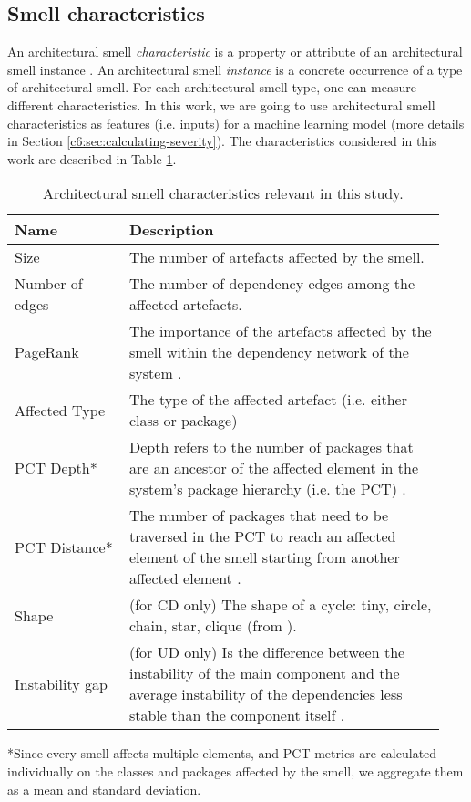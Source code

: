 \subsection{Smell characteristics}
An architectural smell \emph{characteristic} is a property or attribute of an architectural smell instance \cite{Sas2019}. 
An architectural smell \emph{instance} is a concrete occurrence of a type of architectural smell.
For each architectural smell type, one can measure different characteristics.
In this work, we are going to use architectural smell characteristics as features (i.e. inputs) for a machine learning model (more details in Section \ref{c6:sec:calculating-severity}).
The characteristics considered in this work are described in Table \ref{c6:tab:characteristics}.

\begin{table}[tbp]
    \footnotesize
    \centering
    \caption{Architectural smell characteristics relevant in this study.}\label{c6:tab:characteristics}
    \begin{tabular}{p{0.25\linewidth}|p{0.69\linewidth}}\toprule
        \textbf{Name} & \textbf{Description} \\ \midrule
        Size & The number of artefacts affected by the smell. \\
        Number of edges & The number of dependency edges among the affected artefacts. \\ 
        PageRank & The importance of the artefacts affected by the smell within the dependency network of the system \cite{Roveda2018}. \\
        Affected Type & The type of the affected artefact (i.e. either class or package) \\
        PCT Depth* & Depth refers to the number of packages that are an ancestor of the affected element in the system's package hierarchy (i.e. the PCT) \cite{Laval2012}. \\
        PCT Distance* & The number of packages that need to be traversed in the PCT to reach an affected element of the smell starting from another affected element \cite{Laval2012,AlMutawa2014}.\\
        Shape & (for CD only) The shape of a cycle: tiny, circle, chain, star, clique (from \cite{AlMutawa2014}). \\
        Instability gap & (for UD only) Is the difference between the instability of the main component and the average instability of the dependencies less stable than the component itself \cite{Arcelli2016}. \\\midrule
    \end{tabular}
    \scriptsize{*Since every smell affects multiple elements, and PCT metrics are calculated individually on the classes and packages affected by the smell, we aggregate them as a mean and standard deviation.}
\end{table}

